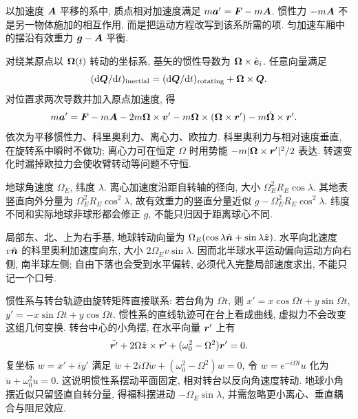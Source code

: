 \label{ch:frames}
以加速度 $\boldsymbol{A}$ 平移的系中, 质点相对加速度满足 $m\boldsymbol{a}'=\boldsymbol{F}-m\boldsymbol{A}$. 惯性力 $-m\boldsymbol{A}$ 不是另一物体施加的相互作用, 而是把运动方程改写到该系所需的项. 匀加速车厢中的摆沿有效重力 $\boldsymbol{g}-\boldsymbol{A}$ 平衡.

对绕某原点以 $\boldsymbol{\Omega}(t)$ 转动的坐标系, 基矢的惯性导数为 $\boldsymbol{\Omega}\times\hat{\boldsymbol{e}}_i$. 任意向量满足
\begin{equation}
(\mathrm d\boldsymbol{Q}/\mathrm dt)_{\rm inertial}
=(\mathrm d\boldsymbol{Q}/\mathrm dt)_{\rm rotating}+\boldsymbol{\Omega}\times\boldsymbol{Q}.
\end{equation}
对位置求两次导数并加入原点加速度, 得
\begin{align}
m\boldsymbol{a}'={}&\boldsymbol{F}-m\boldsymbol{A}-2m\boldsymbol{\Omega}\times\boldsymbol{v}'
-m\boldsymbol{\Omega}\times(\boldsymbol{\Omega}\times\boldsymbol{r}')
-m\dot{\boldsymbol{\Omega}}\times\boldsymbol{r}'.\label{eq:rotframe}
\end{align}
依次为平移惯性力、科里奥利力、离心力、欧拉力. 科里奥利力与相对速度垂直, 在旋转系中瞬时不做功; 离心力可在恒定 $\Omega$ 时用势能 $-m|\boldsymbol{\Omega}\times\boldsymbol{r}'|^2/2$ 表达. 转速变化时漏掉欧拉力会使收臂转动等问题不守恒.

地球角速度 $\Omega_E$, 纬度 $\lambda$. 离心加速度沿距自转轴的径向, 大小 $\Omega_E^2R_E\cos\lambda$. 其地表竖直向外分量为 $\Omega_E^2R_E\cos^2\lambda$, 故有效重力的竖直分量近似 $g-\Omega_E^2R_E\cos^2\lambda$. 纬度不同和实际地球非球形都会修正 $g$, 不能只归因于距离球心不同.

局部东、北、上为右手基, 地球转动向量为 $\Omega_E(\cos\lambda\hat{\boldsymbol{n}}+\sin\lambda\hat{\boldsymbol{z}})$. 水平向北速度 $v\hat{\boldsymbol{n}}$ 的科里奥利加速度向东, 大小 $2\Omega_Ev\sin\lambda$. 因而北半球水平运动偏向运动方向右侧, 南半球左侧; 自由下落也会受到水平偏转, 必须代入完整局部速度求出, 不能只记一个口号.

惯性系与转台轨迹由旋转矩阵直接联系: 若台角为 $\Omega t$, 则 $x'=x\cos\Omega t+y\sin\Omega t$, $y'=-x\sin\Omega t+y\cos\Omega t$. 惯性系的直线轨迹可在台上看成曲线, 虚拟力不会改变这组几何变换. 转台中心的小角摆, 在水平向量 $\boldsymbol{r}'$ 上有
\begin{equation}
\ddot{\boldsymbol{r}'}+2\Omega\hat{\boldsymbol{z}}\times\dot{\boldsymbol{r}'}+(\omega_0^2-\Omega^2)\boldsymbol{r}'=0.
\end{equation}
复坐标 $w=x'+iy'$ 满足 $\ddot w+2i\Omega\dot w+(\omega_0^2-\Omega^2)w=0$, 令 $w=e^{-i\Omega t}u$ 化为 $\ddot u+\omega_0^2u=0$. 这说明惯性系摆动平面固定, 相对转台以反向角速度转动. 地球小角摆近似只留竖直自转分量, 得福科摆进动 $-\Omega_E\sin\lambda$, 并需忽略更小离心、垂直耦合与阻尼效应.

